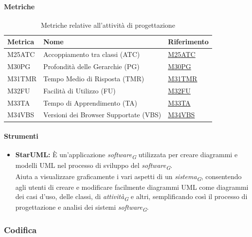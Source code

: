 \paragraph{Metriche}
\begin{table}[H]
    \centering
    \begin{tabular}{|C{3cm}|C{3cm}|C{4cm}|}
    \hline
    Metrica & Nome & Riferimento \\
    \hline \hline
    M25ATC & Accoppiamento tra classi (ATC) & \hyperlink{item:M25ATC}{\textcolor{linkcolor}{M25ATC}} \\
    M30PG & Profondità delle Gerarchie (PG) &  \hyperlink{item:M30PG}{\textcolor{linkcolor}{M30PG}} \\
    M31TMR & Tempo Medio di Risposta (TMR) & \hyperlink{item:M31TMR}{\textcolor{linkcolor}{M31TMR}} \\
    M32FU & Facilità di Utilizzo (FU) & \hyperlink{item:M32FU}{\textcolor{linkcolor}{M32FU}} \\
    M33TA & Tempo di Apprendimento (TA) & \hyperlink{item:M33TA}{\textcolor{linkcolor}{M33TA}} \\
    M34VBS & Versioni dei Browser Supportate (VBS) & \hyperlink{item:M34VBS}{\textcolor{linkcolor}{M34VBS}} \\
    \hline
    \end{tabular}
    \caption{Metriche relative all'attività di progettazione}
\end{table}

\paragraph{Strumenti}
\begin{itemize}
    \item \textbf{StarUML:}
    È un'applicazione \textit{software}\textsubscript{\textit{G}} utilizzata per creare diagrammi e modelli UML nel processo di sviluppo del \textit{software}\textsubscript{\textit{G}}. \\
    Aiuta a visualizzare graficamente i vari aspetti di un \textit{sistema}\textsubscript{\textit{G}}, consentendo agli utenti di creare e modificare facilmente diagrammi UML come diagrammi dei casi d'uso, delle classi, di \textit{attività}\textsubscript{\textit{G}} e altri, semplificando così il processo di progettazione e analisi dei sistemi \textit{software}\textsubscript{\textit{G}}.
\end{itemize}

\subsubsection{Codifica}

